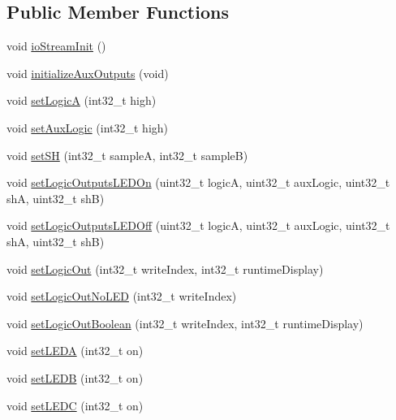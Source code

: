 \subsection*{Public Member Functions}
\begin{DoxyCompactItemize}
\item 
void \mbox{\hyperlink{class_via_module_a828697a5278c926373fe8f49114e0503}{io\+Stream\+Init}} ()
\item 
void \mbox{\hyperlink{class_via_module_a920be7d9a70222fde0fda7d807538272}{initialize\+Aux\+Outputs}} (void)
\item 
void \mbox{\hyperlink{class_via_module_a9add4c62e49aef8e8a122c923e31edc7}{set\+LogicA}} (int32\+\_\+t high)
\item 
void \mbox{\hyperlink{class_via_module_a6d68fc57d798138024c4e2079cbab3f3}{set\+Aux\+Logic}} (int32\+\_\+t high)
\item 
void \mbox{\hyperlink{class_via_module_a0f04112b4dde7164b36fa8916e4ae054}{set\+SH}} (int32\+\_\+t sampleA, int32\+\_\+t sampleB)
\item 
void \mbox{\hyperlink{class_via_module_ad676ccf2b9177bccfc7842967a792fa1}{set\+Logic\+Outputs\+L\+E\+D\+On}} (uint32\+\_\+t logicA, uint32\+\_\+t aux\+Logic, uint32\+\_\+t shA, uint32\+\_\+t shB)
\item 
void \mbox{\hyperlink{class_via_module_ab7f3b8c185a7e46f6412753c9d17ead9}{set\+Logic\+Outputs\+L\+E\+D\+Off}} (uint32\+\_\+t logicA, uint32\+\_\+t aux\+Logic, uint32\+\_\+t shA, uint32\+\_\+t shB)
\item 
void \mbox{\hyperlink{class_via_module_a980dceea193632fc47c663dc2adcf7ca}{set\+Logic\+Out}} (int32\+\_\+t write\+Index, int32\+\_\+t runtime\+Display)
\item 
void \mbox{\hyperlink{class_via_module_a6a0572d7fc135512a278b4fb304014d2}{set\+Logic\+Out\+No\+L\+ED}} (int32\+\_\+t write\+Index)
\item 
void \mbox{\hyperlink{class_via_module_ad7dd37cc52066d45418818743b3d23ad}{set\+Logic\+Out\+Boolean}} (int32\+\_\+t write\+Index, int32\+\_\+t runtime\+Display)
\item 
void \mbox{\hyperlink{class_via_module_a1ee37348829a21c99dd924361246a16a}{set\+L\+E\+DA}} (int32\+\_\+t on)
\item 
void \mbox{\hyperlink{class_via_module_a26f8a7cb6d23f939d3dfcfae035d914e}{set\+L\+E\+DB}} (int32\+\_\+t on)
\item 
void \mbox{\hyperlink{class_via_module_a9b2a127bfdbf2240fbdd1f79bbef52bc}{set\+L\+E\+DC}} (int32\+\_\+t on)
\item 

\end{DoxyCompactItemize}
